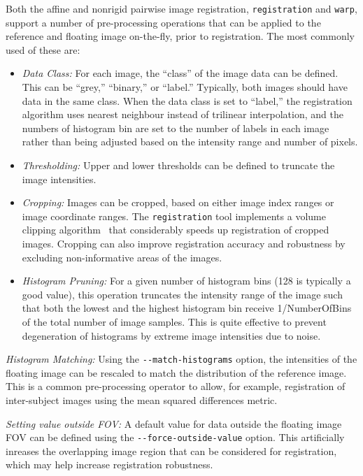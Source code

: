 \documentclass{InsightArticle}
\begin{document}
Both the affine and nonrigid pairwise image registration, \verb|registration|
and \verb|warp|, support a number of pre-processing operations that can be
applied to the reference and floating image on-the-fly, prior to
registration. The most commonly used of these are:
\begin{itemize}
\item {\em Data Class:\/} For each image, the ``class'' of the image data can
  be defined. This can be ``grey,'' ``binary,'' or ``label.'' Typically, both
  images should have data in the same class. When the data class is set to
  ``label,'' the registration algorithm uses nearest neighbour instead of
  trilinear interpolation, and the numbers of histogram bin are set to the
  number of labels in each image rather than being adjusted based on the
  intensity range and number of pixels.
\item {\em Thresholding:\/} Upper and lower thresholds can be defined to
  truncate the image intensities.
\item {\em Cropping:\/} Images can be cropped, based on either image index
  ranges or image coordinate ranges. The \verb|registration| tool implements a
  volume clipping algorithm~\cite{Rohlfing:2003} that considerably speeds up
  registration of cropped images. Cropping can also improve registration
  accuracy and robustness by excluding non-informative areas of the images.
\item {\em Histogram Pruning:\/} For a given number of histogram bins (128 is
  typically a good value), this operation truncates the intensity range of the
  image such that both the lowest and the highest histogram bin receive
  1/NumberOfBins of the total number of image samples. This is quite effective
  to prevent degeneration of histograms by extreme image intensities due to
  noise.
\end{itemize}

{\em Histogram Matching:\/} Using the \verb|--match-histograms| option, the
intensities of the floating image can be rescaled to match the distribution of
the reference image. This is a common pre-processing operator to allow, for
example, registration of inter-subject images using the mean squared
differences metric.

{\em Setting value outside FOV:\/} A default value for data outside the
floating image FOV can be defined using the \verb|--force-outside-value|
option. This artificially inreases the overlapping image region that can be
considered for registration, which may help increase registration robustness. 
\end{document}
